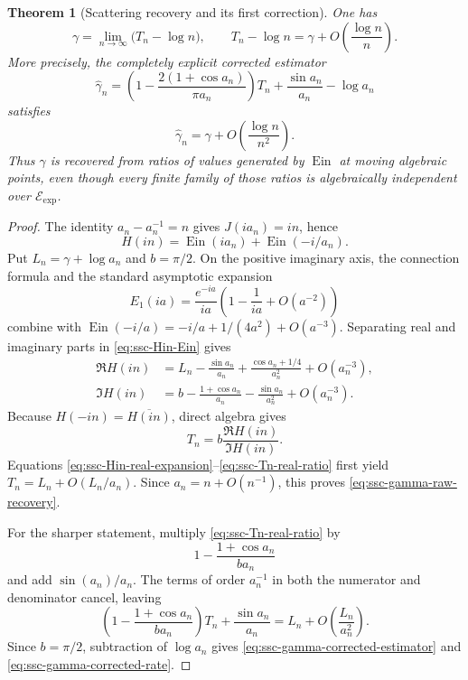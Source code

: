 \documentclass[11pt]{article}
\newtheorem{theorem}{Theorem}[section]
\theoremstyle{definition}
\theoremstyle{remark}
\newcommand{\Ein}{\operatorname{Ein}}
\newcommand{\Eexp}{\mathcal E_{\mathrm{exp}}}
\begin{document}
\begin{theorem}[Scattering recovery and its first correction]
\label{thm:ssc-gamma-scattering}
One has
\begin{equation}\label{eq:ssc-gamma-raw-recovery}
 \gamma=\lim_{n\to\infty}\bigl(T_n-\log n\bigr),
 \qquad
 T_n-\log n
 =\gamma+O\!\left(\frac{\log n}{n}\right).
\end{equation}
More precisely, the completely explicit corrected estimator
\begin{equation}\label{eq:ssc-gamma-corrected-estimator}
 \widehat\gamma_n=
 \left(1-\frac{2(1+\cos a_n)}{\pi a_n}\right)T_n
 +\frac{\sin a_n}{a_n}-\log a_n
\end{equation}
satisfies
\begin{equation}\label{eq:ssc-gamma-corrected-rate}
 \widehat\gamma_n
 =\gamma+O\!\left(\frac{\log n}{n^2}\right).
\end{equation}
Thus \(\gamma\) is recovered from ratios of values generated by
\(\Ein\) at moving algebraic points, even though every finite family of
those ratios is algebraically independent over \(\Eexp\).
\end{theorem}

\begin{proof}
The identity \(a_n-a_n^{-1}=n\) gives \(J(ia_n)=in\), hence
\begin{equation}\label{eq:ssc-Hin-Ein}
 H(in)=\Ein(ia_n)+\Ein(-i/a_n).
\end{equation}
Put \(L_n=\gamma+\log a_n\) and \(b=\pi/2\).  On the positive imaginary
axis, the connection formula and the standard asymptotic expansion
\[
 E_1(ia)=\frac{e^{-ia}}{ia}
 \left(1-\frac1{ia}+O(a^{-2})\right)
\]
combine with
\(\Ein(-i/a)=-i/a+1/(4a^2)+O(a^{-3})\).  Separating real and imaginary
parts in \eqref{eq:ssc-Hin-Ein} gives
\begin{align}
 \Re H(in)
 &=L_n-\frac{\sin a_n}{a_n}
   +\frac{\cos a_n+1/4}{a_n^2}+O(a_n^{-3}),
   \label{eq:ssc-Hin-real-expansion}\\
 \Im H(in)
 &=b-\frac{1+\cos a_n}{a_n}
   -\frac{\sin a_n}{a_n^2}+O(a_n^{-3}).
   \label{eq:ssc-Hin-imag-expansion}
\end{align}
Because \(H(-in)=\overline{H(in)}\), direct algebra gives
\begin{equation}\label{eq:ssc-Tn-real-ratio}
 T_n=b\frac{\Re H(in)}{\Im H(in)}.
\end{equation}
Equations \eqref{eq:ssc-Hin-real-expansion}--\eqref{eq:ssc-Tn-real-ratio}
first yield
\(T_n=L_n+O(L_n/a_n)\).  Since
\(a_n=n+O(n^{-1})\), this proves
\eqref{eq:ssc-gamma-raw-recovery}.

For the sharper statement, multiply \eqref{eq:ssc-Tn-real-ratio} by
\[
 1-\frac{1+\cos a_n}{b a_n}
\]
and add \(\sin(a_n)/a_n\).  The terms of order \(a_n^{-1}\) in both the
numerator and denominator cancel, leaving
\[
 \left(1-\frac{1+\cos a_n}{b a_n}\right)T_n
 +\frac{\sin a_n}{a_n}
 =L_n+O\!\left(\frac{L_n}{a_n^2}\right).
\]
Since \(b=\pi/2\), subtraction of \(\log a_n\) gives
\eqref{eq:ssc-gamma-corrected-estimator} and
\eqref{eq:ssc-gamma-corrected-rate}.
\end{proof}
\end{document}
